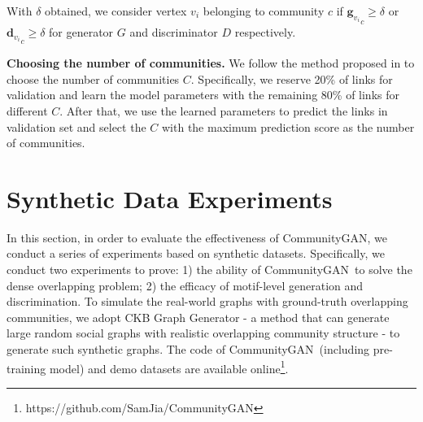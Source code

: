 \documentclass[sigconf]{acmart}
\newcommand{\ComGAN}{CommunityGAN}
\begin{document}
With $\delta$ obtained, we consider vertex $v_i$ belonging to community $c$ if ${\mathbf{g}_{v_i}}_c \ge \delta$ or ${\mathbf{d}_{v_i}}_c \ge \delta$ for generator $G$ and discriminator $D$ respectively. 

\vspace{5pt}\noindent\textbf{Choosing the number of communities.}
We follow the method proposed in \cite{airoldi2009mixed} to choose the number of communities $C$.
Specifically, we reserve 20\% of links for validation and learn the model parameters with the remaining 80\% of links for different $C$.
After that, we use the learned parameters to predict the links in validation set and select the $C$ with the maximum prediction score as the number of communities. 



\section{Synthetic Data Experiments}

In this section, in order to evaluate the effectiveness of \ComGAN, we conduct a series of experiments based on synthetic datasets.
Specifically, we conduct two experiments to prove: 1) the ability of \ComGAN~to solve the dense overlapping problem; 2) the efficacy of motif-level generation and discrimination.
To simulate the real-world graphs with ground-truth overlapping communities, we adopt CKB Graph Generator - a method that can generate large random social graphs with realistic overlapping community structure \cite{ckb-benchmark} - to generate such synthetic graphs.
The code of \ComGAN~(including pre-training model) and demo datasets are available online\footnote{https://github.com/SamJia/CommunityGAN}.
\end{document}
